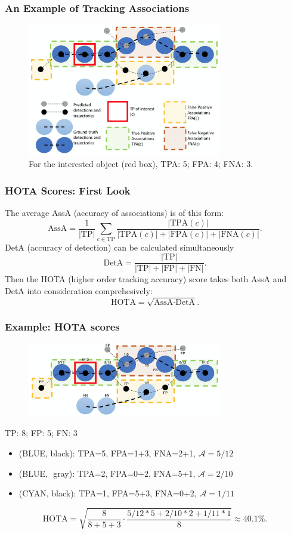 \documentclass[slidetop, mathserif, dvipsnames]{beamer}
\begin{document}
\begin{frame}
	\frametitle{An Example of Tracking Associations}
	\begin{figure}
		\includegraphics[width=240pt]{pics/fig8.png}
		\caption{For the interested object (red box), TPA: 5; FPA: 4; FNA: 3.}
	\end{figure}
\end{frame}

\begin{frame}
	\frametitle{HOTA Scores: First Look}

	The average AssA (accuracy of associations) is of this form:
	\[
		\text{AssA} = \dfrac{1}{|\text{TP}|} \sum_{c\in\text{TP}} \dfrac{|\text{TPA}(c)|}{|\text{TPA}(c)|+|\text{FPA}(c)|+|\text{FNA}(c)|}.
	\]
	DetA (accuracy of detection) can be calculated simultaneously
	\[
		\text{DetA} = \dfrac{|\text{TP}|}{|\text{TP}| +|\text{FP}| + |\text{FN}|}.
	\]
	Then the HOTA (higher order tracking accuracy) score takes both
	AssA and DetA into consideration comprehesively:
	\[
		\text{HOTA} = \sqrt{\text{AssA} \cdot \text{DetA}}.
	\]

\end{frame}

\begin{frame}
	\frametitle{Example: HOTA scores}

	\begin{figure}
		\includegraphics[width=240pt]{pics/track06.png}
	\end{figure}

	\vspace{-20pt}
	TP: 8; FP: 5; FN: 3
	\begin{itemize}
	\item ({\color{MidnightBlue}BLUE}, black): TPA=5, FPA=1+3, FNA=2+1, $\mathcal A= 5/12$
	\item ({\color{MidnightBlue}BLUE},\,\, {\color{gray}gray}): TPA=2, FPA=0+2, FNA=5+1, $\mathcal A=2/10$
	\item ({\color{cyan}CYAN}, black): TPA=1, FPA=5+3, FNA=0+2, $\mathcal A=1/11$
	\end{itemize}

	\vspace{-10pt}
	\[
		\text{HOTA} = \sqrt{\dfrac{8}{8+5+3} \cdot \dfrac{5/12*5 + 2/10*2 + 1/11*1}{8}} \approx 40.1\%.
	\]

\end{frame}
\end{document}
